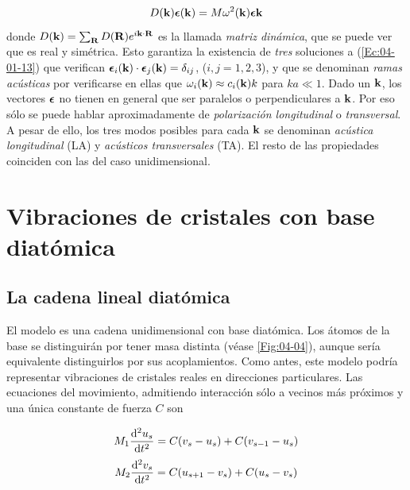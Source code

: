 \begin{equation}
	D(\mathbf{k}) \boldsymbol{\epsilon} (\mathbf{k}) = M \omega^2 (\mathbf{k}) \boldsymbol{\epsilon} \mathbf{k} \label{Ec:04-01-13}
\end{equation}
donde $D(\mathbf{k}) = \sum_{\mathbf{R}} D(\mathbf{R}) e^{i \mathbf{k} \cdot \mathbf{R}}$ es la llamada \textit{matriz dinámica}, que se puede ver que es real y simétrica. Esto garantiza la existencia de \textit{tres} soluciones a (\ref{Ec:04-01-13}) que verifican $\boldsymbol{\epsilon}_i (\mathbf{k}) \cdot \boldsymbol{\epsilon}_j (\mathbf{k}) = \delta_{ij}$, ($i,j=1,2,3$), y que se denominan \textit{ramas acústicas} por verificarse en ellas que $\omega_i (\mathbf{k}) \approx c_i (\mathbf{k})k$ para $ka\ll 1$. Dado un $\mathbf{k}$, los vectores $\boldsymbol{\epsilon}$ no tienen en general que ser paralelos o perpendiculares a $\mathbf{k}$. Por eso sólo se puede hablar aproximadamente de \textit{polarización longitudinal} o \textit{transversal}. A pesar de ello, los tres modos posibles para cada $\mathbf{k}$ se denominan \textit{acústica longitudinal} (LA) y \textit{acústicos transversales} (TA). El resto de las propiedades coinciden con las del caso unidimensional.

\section{Vibraciones de cristales con base diatómica}

\subsection{La cadena lineal diatómica}

El modelo es una cadena unidimensional con base diatómica. Los átomos de la base se distinguirán por tener masa distinta (véase \ref{Fig:04-04}), aunque sería equivalente distinguirlos por sus acoplamientos. Como antes, este modelo podría representar vibraciones de cristales reales en direcciones particulares. Las ecuaciones del movimiento, admitiendo interacción sólo a vecinos más próximos y una única constante de fuerza $C$ son 

\begin{equation*}
	M_1 \frac{\mathrm{d} ^2 u_s}{\mathrm{d} t^2} = C(v_s - u_s) + C(v_{s-1}-u_s)
\end{equation*}
\begin{equation}
	M_2 \frac{\mathrm{d} ^2 v_s}{\mathrm{d} t^2} = C(u_{s+1} - v_s) + C(u_{s}-v_s) \label{Ec:04-02-01}
\end{equation}

